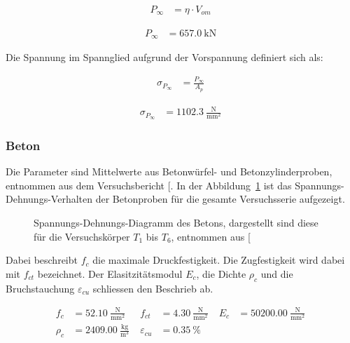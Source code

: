 \documentclass[
  11pt,
  letterpaper,
]{scrreprt}
\begin{document}
$$
\begin{aligned}
P_{\infty} &= \eta \cdot V_{om} \; 
\end{aligned}
$$

$$
\begin{aligned}
P_{\infty} &= 657.0\ \mathrm{kN} \;
\end{aligned}
$$

Die Spannung im Spannglied aufgrund der Vorspannung definiert sich als:

$$
\begin{aligned}
\sigma_{P_{\infty}} &= \frac{ P_{\infty} }{ A_{p} } \; 
\end{aligned}
$$

$$
\begin{aligned}
\sigma_{P_{\infty}} &= 1102.3\ \frac{\mathrm{N}}{\mathrm{mm}^{2}} \;
\end{aligned}
$$

\subsubsection{Beton}\label{beton}

Die Parameter sind Mittelwerte aus Betonwürfel- und Betonzylinderproben,
entnommen aus dem Versuchsbericht
{[}\citeproc{ref-sigrist_versuche_1993}{5}{]}. In der
Abbildung~\ref{fig-sigma_eps_beton} ist das Spannungs-Dehnungs-Verhalten
der Betonproben für die gesamte Versuchsserie aufgezeigt.

\begin{figure}[H]


\caption{\label{fig-sigma_eps_beton}Spannungs-Dehnungs-Diagramm des
Betons, dargestellt sind diese für die Versuchskörper \(T_1\) bis
\(T_6\), entnommen aus {[}\citeproc{ref-sigrist_versuche_1993}{5}{]}}

\end{figure}%

Dabei beschreibt \(f_c\) die maximale Druckfestigkeit. Die Zugfestigkeit
wird dabei mit \(f_{ct}\) bezeichnet. Der Elasitzitätsmodul \(E_c\), die
Dichte \(\rho_c\) und die Bruchstauchung \(\varepsilon_{cu}\) schliessen
den Beschrieb ab.

$$
\begin{aligned}
f_{c} &= 52.10\ \frac{\mathrm{N}}{\mathrm{mm}^{2}} \; 
 &f_{ct} &= 4.30\ \frac{\mathrm{N}}{\mathrm{mm}^{2}} \; 
 &E_{c} &= 50200.00\ \frac{\mathrm{N}}{\mathrm{mm}^{2}} \; 
\\[10pt]
 \rho_{c} &= 2409.00\ \frac{\mathrm{kg}}{\mathrm{m}^{3}} \; 
 &\varepsilon_{cu} &= 0.35\ \mathrm{\%} \;
\end{aligned}
$$
\end{document}
